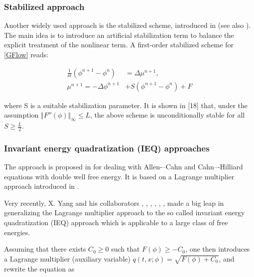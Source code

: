 \documentclass{beamer}
\begin{document}
    \begin{frame}
    \frametitle{Stabilized approach}
Another widely used approach is the stabilized scheme, introduced in \cite{Zhu19993564} (see also \cite{Shen20101669}). The main idea is to introduce an artificial stabilization term to balance the explicit treatment of the nonlinear term. A first-order stabilized scheme for \ref{GFlow} reads:

\begin{equation}\label{Stabilized approach}
  \begin{split}
\frac{1}{\delta t}(\phi^{n+1}-\phi^n) &= \Delta \mu^{n+1},\\
\mu^{n+1} = -\Delta\phi^{n+1}&+S(\phi^{n+1}-\phi^n)+F
  \end{split}
\end{equation}

where S is a suitable stabilization parameter. It is shown in [18] that, under the assumption $\Vert F''(\phi)\Vert_\infty\leq L$, the above scheme is unconditionally stable for all $S \geq \frac{L}{2}$.

    \end{frame}

    \begin{frame}
    \frametitle{Invariant energy quadratization (IEQ) approaches}
	
The approach is proposed in \cite{Guillén-gonzález2013140} for dealing with Allen-–Cahn and Cahn–-Hilliard equations with double well free energy. It is based on a Lagrange multiplier approach introduced in \cite{Badia20111686}.


Very recently, X. Yang and his collaborators \cite{Yang2016294}, \cite{Yang2017691}, \cite{Yang2017104}, \cite{Yu2017665}, \cite{Zhao2017803}, \cite{Yang20171005}, \cite{doi:10.1142/S0218202517500373} made a big leap in generalizing the Lagrange multiplier approach to the so called invariant energy quadratization (IEQ) approach which is applicable to a large class of free energies.	
	
Assuming that there exists $C_0 \geq 0$ such that $F(\phi) \geq -C_0$, one then introduces a Lagrange multiplier (auxiliary variable) $q(t,x;\phi)=\sqrt{F(\phi)+C_0}$, and rewrite the equation as
	\end{frame}
\end{document}

